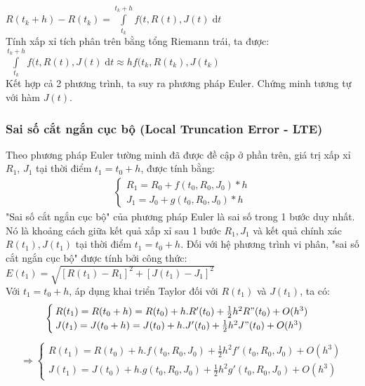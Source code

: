 \hspace*{4cm} {$R(t_k + h) - R(t_k) = \displaystyle\int\limits_{t_k}^{t_k + h}f(
t, R(t), J(t)\;\mathrm{d}t$}\\
\hspace*{0.5cm} {Tính xấp xỉ tích phân trên bằng tổng Riemann trái, ta được:}\\
\hspace*{4cm} {$\displaystyle\int\limits_{t_k}^{t_k + h}f(t, R(t), J(t)\;\mathrm{d}t \approx hf(t_k, R(t_k), J(t_k)$}\\
\hspace*{0.5cm} {Kết hợp cả 2 phương trình, ta suy ra phương pháp Euler. Chứng minh tương tự với hàm $J(t)$.}
\subsubsection{Sai số cắt ngắn cục bộ (Local Truncation Error - LTE)}
\hspace*{0.5cm} {Theo phương pháp Euler tường minh đã được đề cập ở phần trên, giá trị xấp xỉ $R_1$, $J_1$ tại thời điểm $t_1 = t_0 + h$, được tính bằng:}
\begin{align}
    \begin{cases}
        R_1 = R_0 + f(t_0, R_0, J_0) * h\\
        J_1 = J_0 + g(t_0, R_0, J_0) * h
    \end{cases}
\end{align}
\hspace*{0.5cm} {"Sai số cắt ngắn cục bộ" của phương pháp Euler là sai số trong 1 bước duy nhất. Nó là khoảng cách giữa kết quả xấp xỉ sau 1 bước $R_1, J_1$ và kết quả chính xác $R(t_1), J(t_1)$ tại thời điểm $t_1 = t_0 + h$. Đối với hệ phương trình vi phân, "sai số cắt ngắn cục bộ" được tính bởi công thức: }\\
\hspace*{4cm} {$E(t_1) = \sqrt{[R(t_1) - R_1]^2 + [J(t_1) - J_1]^2}$}\\
\hspace*{0.5cm} {Với $t_1 = t_0 + h$, áp dụng khai triển Taylor đối với $R(t_1)$ và $J(t_1)$, ta có:}
\begin{align}
    \begin{cases}
        R(t_1) = R(t_0 + h) = R(t_0) + h.R'(t_0) + \frac{1}{2}h^2R"(t_0) + O(h^3)\\
        J(t_1) = J(t_0 + h) = J(t_0) + h.J'(t_0) + \frac{1}{2}h^2J"(t_0) + O(h^3)
    \end{cases}
\end{align}
\begin{align}
    \Rightarrow
    \begin{cases}
        R(t_1) = R(t_0) + h.f(t_0, R_0, J_0) + \frac{1}{2}h^2f'(t_0, R_0, J_0) + O(h^3)\\
        J(t_1) = J(t_0) + h.g(t_0, R_0, J_0) + \frac{1}{2}h^2g'(t_0, R_0, J_0) + O(h^3)
    \end{cases}
\end{align}
